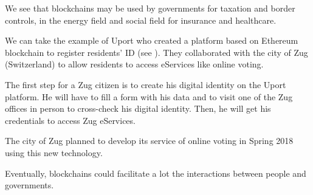 We see that blockchains may be used by governments for taxation and border controls, in the energy field and social field for insurance and healthcare. \newline

We can take the example of Uport who created a platform based on Ethereum blockchain to register residents' ID (see \cite{uport}). They collaborated with the city of Zug (Switzerland) to allow residents to access eServices like online voting. \newline

The first step for a Zug citizen is to create his digital identity on the Uport platform. He will have to fill a form with his data and to visit one of the Zug offices in person to cross-check his digital identity. Then, he will get his credentials to access Zug eServices. \newline

The city of Zug planned to develop its service of online voting in Spring 2018 using this new technology.

Eventually, blockchains could facilitate a lot the interactions between people and governments.
